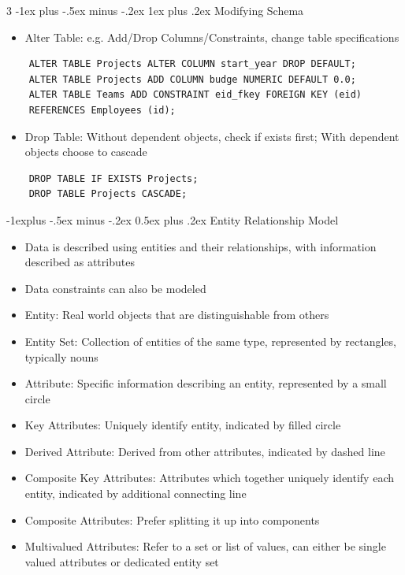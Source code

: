 \documentclass[10pt, landscape]{article}
\makeatletter
\renewcommand{\section}{\@startsection{section}{1}{0mm}%
                                {-1ex plus -.5ex minus -.2ex}%
                                {0.5ex plus .2ex}%
                                {\normalfont\large\bfseries}}
\renewcommand{\section}{\@startsection{section}{2}{0mm}%
                                {-1explus -.5ex minus -.2ex}%
                                {0.5ex plus .2ex}%
                                {\normalfont\normalsize\bfseries}}
\renewcommand{\subsection}{\@startsection{subsection}{3}{0mm}%
                                {-1ex plus -.5ex minus -.2ex}%
                                {1ex plus .2ex}%
                                {\normalfont\small\bfseries}}%
\makeatother
\begin{document}
\begin{multicols*}{3}
\subsection{Modifying Schema}
\begin{itemize}
    \item Alter Table: e.g. Add/Drop Columns/Constraints, change table specifications
\end{itemize}
\begin{verbatim}
    ALTER TABLE Projects ALTER COLUMN start_year DROP DEFAULT;
    ALTER TABLE Projects ADD COLUMN budge NUMERIC DEFAULT 0.0;
    ALTER TABLE Teams ADD CONSTRAINT eid_fkey FOREIGN KEY (eid)
    REFERENCES Employees (id);
\end{verbatim}
\begin{itemize}
    \item Drop Table: Without dependent objects, check if exists first; With dependent objects choose to cascade
\end{itemize}
\begin{verbatim}
    DROP TABLE IF EXISTS Projects;
    DROP TABLE Projects CASCADE;
\end{verbatim}

\section{Entity Relationship Model}
\begin{itemize}
    \item Data is described using entities and their relationships, with information described as attributes
    \item Data constraints can also be modeled
    \item Entity: Real world objects that are distinguishable from others
    \item Entity Set: Collection of entities of the same type, represented by rectangles, typically nouns
    \item Attribute: Specific information describing an entity, represented by a small circle
    \item Key Attributes: Uniquely identify entity, indicated by filled circle
    \item Derived Attribute: Derived from other attributes, indicated by dashed line
    \item Composite Key Attributes: Attributes which together uniquely identify each entity, indicated by additional connecting line
    \item Composite Attributes: Prefer splitting it up into components
    \item Multivalued Attributes: Refer to a set or list of values, can either be single valued attributes or dedicated entity set
\end{itemize}


\end{multicols*}
\end{document}
